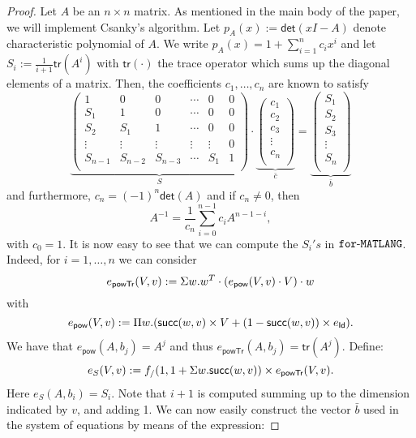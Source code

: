 \begin{proof}
Let $A$ be an $n \times n$ matrix. As mentioned in the main body of the paper, we will implement Csanky's algorithm. Let $p_A(x):=\mathsf{det}(xI-A)$ denote  characteristic polynomial of $A$.  We write $p_A(x)=1 + \sum_{i=1}^n c_ix^i$ and let  $S_i:=\frac{1}{i+1}\mathsf{tr}(A^i)$ with $\mathsf{tr}(\cdot)$ the trace operator which sums up the diagonal elements of a matrix.
Then, the coefficients $c_1,\ldots,c_n$ are known to satisfy 
$$
\underbrace{\left(\begin{matrix}
1 & 0 & 0 & \cdots & 0 & 0\\
S_1 & 1 & 0 & \cdots  &0 & 0\\
S_2 & S_1 & 1 & \cdots  &0 & 0\\
\vdots & \vdots & \vdots & \vdots & \vdots & 0\\
S_{n-1} & S_{n-2} & S_{n-3} & \cdots & S_1 & 1\\
\end{matrix}\right)}_{S}\cdot
\underbrace{\left(\begin{matrix}
c_1\\
c_2\\
c_3\\
\vdots\\
c_n\\
\end{matrix}\right)}_{\bar c}=\underbrace{\left(\begin{matrix}
S_1\\
S_2\\
S_3\\
\vdots\\
S_n\\
\end{matrix}\right)}_{\bar b}
$$
and furthermore, $c_n=(-1)^n\mathsf{det}(A)$ and if $c_{n}\neq 0$, then
$$
A^{-1}=\frac{1}{c_n}\sum_{i=0}^{n-1}c_i A^{n-1-i},
$$
with $c_0=1$. It is now easy to see that we can compute the $S_i's$ in $\texttt{for}\text{-}\texttt{MATLANG}$. Indeed, for
$i=1,\ldots,n$ we can consider
$$
e_{\mathsf{powTr}}(V,v):=\Sigma w. w^T\cdot\left(e_{\mathsf{pow}}(V,v)\cdot V\right)\cdot w
$$
with 
$$
e_{\mathsf{pow}}(V,v):= \Pi w. (\mathsf{succ}(w,v)\times V+(1-\mathsf{succ}(w,v))\times e_{\mathsf{Id}}).
$$
We have that $e_{\mathsf{pow}}(A,b_j)=A^{j}$ and thus $e_{\mathsf{powTr}}(A,b_j)=\mathsf{tr}(A^{j})$. Define:
$$
e_{S}(V,v):=f_{/}(1, 1 + \Sigma w. \mathsf{succ}(w,v))\times e_{\mathsf{powTr}}(V,v).
$$
Here $e_{S}(A,b_i)=S_i$. Note that $i+1$ is computed summing up to the dimension indicated by $v$, and adding 1.
We can now easily construct the vector $\bar b$ used in the system of equations by means of the expression:

\end{proof}
